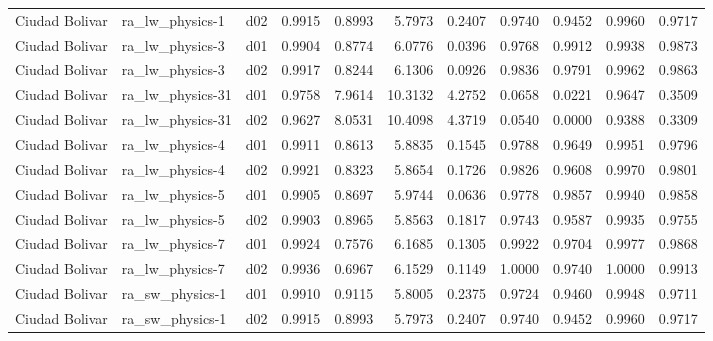 \begin{longtable}{lllrrrrrrrr}
       Ciudad Bolivar  &       ra\_lw\_physics-1 &     d02 &   0.9915 &   0.8993 &   5.7973 &       0.2407 &        0.9740 &       0.9452 &           0.9960 &  0.9717 \\
       Ciudad Bolivar  &       ra\_lw\_physics-3 &     d01 &   0.9904 &   0.8774 &   6.0776 &       0.0396 &        0.9768 &       0.9912 &           0.9938 &  0.9873 \\
       Ciudad Bolivar  &       ra\_lw\_physics-3 &     d02 &   0.9917 &   0.8244 &   6.1306 &       0.0926 &        0.9836 &       0.9791 &           0.9962 &  0.9863 \\
       Ciudad Bolivar  &      ra\_lw\_physics-31 &     d01 &   0.9758 &   7.9614 &  10.3132 &       4.2752 &        0.0658 &       0.0221 &           0.9647 &  0.3509 \\
       Ciudad Bolivar  &      ra\_lw\_physics-31 &     d02 &   0.9627 &   8.0531 &  10.4098 &       4.3719 &        0.0540 &       0.0000 &           0.9388 &  0.3309 \\
       Ciudad Bolivar  &       ra\_lw\_physics-4 &     d01 &   0.9911 &   0.8613 &   5.8835 &       0.1545 &        0.9788 &       0.9649 &           0.9951 &  0.9796 \\
       Ciudad Bolivar  &       ra\_lw\_physics-4 &     d02 &   0.9921 &   0.8323 &   5.8654 &       0.1726 &        0.9826 &       0.9608 &           0.9970 &  0.9801 \\
       Ciudad Bolivar  &       ra\_lw\_physics-5 &     d01 &   0.9905 &   0.8697 &   5.9744 &       0.0636 &        0.9778 &       0.9857 &           0.9940 &  0.9858 \\
       Ciudad Bolivar  &       ra\_lw\_physics-5 &     d02 &   0.9903 &   0.8965 &   5.8563 &       0.1817 &        0.9743 &       0.9587 &           0.9935 &  0.9755 \\
       Ciudad Bolivar  &       ra\_lw\_physics-7 &     d01 &   0.9924 &   0.7576 &   6.1685 &       0.1305 &        0.9922 &       0.9704 &           0.9977 &  0.9868 \\
       Ciudad Bolivar  &       ra\_lw\_physics-7 &     d02 &   0.9936 &   0.6967 &   6.1529 &       0.1149 &        1.0000 &       0.9740 &           1.0000 &  0.9913 \\
       Ciudad Bolivar  &       ra\_sw\_physics-1 &     d01 &   0.9910 &   0.9115 &   5.8005 &       0.2375 &        0.9724 &       0.9460 &           0.9948 &  0.9711 \\
       Ciudad Bolivar  &       ra\_sw\_physics-1 &     d02 &   0.9915 &   0.8993 &   5.7973 &       0.2407 &        0.9740 &       0.9452 &           0.9960 &  0.9717 \\

\end{longtable}
